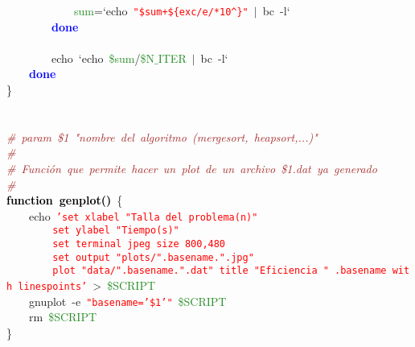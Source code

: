 \mbox{}\ \ \ \ \ \ \ \ \ \ \ \ \textcolor{ForestGreen}{sum}\textcolor{BrickRed}{=}`echo\ \texttt{\textcolor{Red}{"{}\$sum+\$\{exc/e/*10\textasciicircum{}\}"{}}}\ \textcolor{BrickRed}{$|$}\ bc\ -l` \\
\mbox{}\ \ \ \ \ \ \ \ \textbf{\textcolor{Blue}{done}} \\
\mbox{}\ \ \ \ \ \ \ \  \\
\mbox{}\ \ \ \ \ \ \ \ echo\ `echo\ \textcolor{ForestGreen}{\$sum}\textcolor{BrickRed}{/}\textcolor{ForestGreen}{\$N$\_$ITER}\ \textcolor{BrickRed}{$|$}\ bc\ -l` \\
\mbox{}\ \ \ \ \textbf{\textcolor{Blue}{done}} \\
\mbox{}\} \\
\mbox{} \\
\mbox{} \\
\mbox{}\textit{\textcolor{Brown}{\#\ param\ \$1\ "{}nombre\ del\ algoritmo\ (mergesort,\ heapsort,...)"{}}} \\
\mbox{}\textit{\textcolor{Brown}{\#}} \\
\mbox{}\textit{\textcolor{Brown}{\#\ Función\ que\ permite\ hacer\ un\ plot\ de\ un\ archivo\ \$1.dat\ ya\ generado}} \\
\mbox{}\textit{\textcolor{Brown}{\#}} \\
\mbox{}\textbf{\textcolor{Black}{function\ genplot()}}\ \{ \\
\mbox{}\ \ \ \ echo\ \texttt{\textcolor{Red}{'set\ xlabel\ "{}Talla\ del\ problema(n)"{}}} \\
\mbox{}\texttt{\textcolor{Red}{\ \ \ \ \ \ \ \ set\ ylabel\ "{}Tiempo(s)"{}}} \\
\mbox{}\texttt{\textcolor{Red}{\ \ \ \ \ \ \ \ set\ terminal\ jpeg\ size\ 800,480}} \\
\mbox{}\texttt{\textcolor{Red}{\ \ \ \ \ \ \ \ set\ output\ "{}plots/"{}.basename."{}.jpg"{}}} \\
\mbox{}\texttt{\textcolor{Red}{\ \ \ \ \ \ \ \ plot\ "{}data/"{}.basename."{}.dat"{}\ title\ "{}Eficiencia\ "{}\ .basename\ with\ linespoints'}}\ \textcolor{BrickRed}{\textgreater{}}\ \textcolor{ForestGreen}{\$SCRIPT} \\
\mbox{}\ \ \ \ gnuplot\ -e\ \texttt{\textcolor{Red}{"{}basename='\$1'"{}}}\ \textcolor{ForestGreen}{\$SCRIPT} \\
\mbox{}\ \ \ \ rm\ \textcolor{ForestGreen}{\$SCRIPT} \\
\mbox{}\} \\
\mbox{} \\
\mbox{} \\
